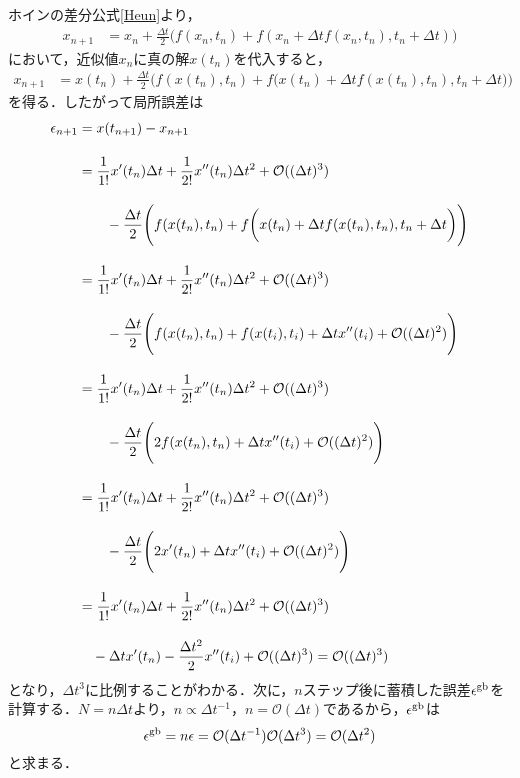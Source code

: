 \documentclass[12pt]{jsarticle}\usepackage{ifthen}\newboolean{enlarge}\setboolean{enlarge}{false}
\newcommand{\nn}{\notag \\}
\begin{document}
ホインの差分公式\eqref{Heun}より，
\begin{align}
	x_{n+1}&=x_n+\frac{\Delta t}{2}\Biggl(
	f(x_n,t_n)
	+f(x_n+\Delta t f(x_n,t_n), t_n + \Delta t)
	\Biggr)
\end{align}
において，近似値$x_n$に真の解$x(t_n)$を代入すると，
\begin{align}
	x_{n+1}&=x(t_n)+\frac{\Delta t}{2}\Biggl(
	f(x(t_n),t_n)
	+f\biggl(
	x(t_n)+\Delta t f(x(t_n),t_n), t_n + \Delta t
	\biggr)
	\Biggr)
\end{align}
を得る．したがって局所誤差は
\begin{align}
	\epsilon_{n+1}&=x(t_{n+1})-x_{n+1}\nn[10pt]
	&=\frac{1}{1!}x^{\prime}(t_n)\Delta t +\frac{1}{2!}x^{\prime\prime}(t_n)\Delta t^2+\mathcal{O}((\Delta t)^3)\nn[10pt]
	&\hspace{20pt}-\frac{\Delta t}{2}\Biggl(
	f(x(t_n),t_n)
	+f\biggl(
	x(t_n)+\Delta t f(x(t_n),t_n), t_n + \Delta t
	\biggr)
	\Biggr)\nn[10pt]
	&=\frac{1}{1!}x^{\prime}(t_n)\Delta t +\frac{1}{2!}x^{\prime\prime}(t_n)\Delta t^2+\mathcal{O}((\Delta t)^3)\nn[10pt]
	&\hspace{20pt}-\frac{\Delta t}{2}\Biggl(
	f(x(t_n),t_n)+
	f(x(t_i),t_i)+\Delta tx^{\prime\prime}(t_i) + \mathcal{O}((\Delta t)^2)
	\Biggr)\nn[10pt]
	&=\frac{1}{1!}x^{\prime}(t_n)\Delta t +\frac{1}{2!}x^{\prime\prime}(t_n)\Delta t^2+\mathcal{O}((\Delta t)^3)\nn[10pt]
	&\hspace{20pt}-\frac{\Delta t}{2}\Biggl(
	2f(x(t_n),t_n)+\Delta tx^{\prime\prime}(t_i) + \mathcal{O}((\Delta t)^2)
	\Biggr)\nn[10pt]
	&=\frac{1}{1!}x^{\prime}(t_n)\Delta t +\frac{1}{2!}x^{\prime\prime}(t_n)\Delta t^2+\mathcal{O}((\Delta t)^3)\nn[10pt]
	&\hspace{20pt}-\frac{\Delta t}{2}\Biggl(
	2x^{\prime}(t_n)+\Delta tx^{\prime\prime}(t_i) + \mathcal{O}((\Delta t)^2)
	\Biggr)\nn[10pt]
	&=\frac{1}{1!}x^{\prime}(t_n)\Delta t +\frac{1}{2!}x^{\prime\prime}(t_n)\Delta t^2+\mathcal{O}((\Delta t)^3)\nn[10pt]
	&\hspace{10pt}-\Delta t x^{\prime}(t_n)
	-\frac{\Delta t^2}{2}x^{\prime\prime}(t_i) + \mathcal{O}((\Delta t)^3)
	= \mathcal{O}((\Delta t)^3)
\end{align}
となり，$\Delta t^3$に比例することがわかる．次に，$n$ステップ後に蓄積した誤差$\epsilon^{\rm{gb}}$を計算する．$N=n\Delta t$より，$n \propto \Delta t^{-1}$，$n=\mathcal{O}(\Delta t)$であるから，$\epsilon^{\rm{gb}}$は
\begin{equation}
	\epsilon^{\rm{gb}}=n\epsilon
	=\mathcal{O}(\Delta t^{-1})\mathcal{O}(\Delta t^3)
	=\mathcal{O}(\Delta t^2)
\end{equation}
と求まる．
\end{document}
